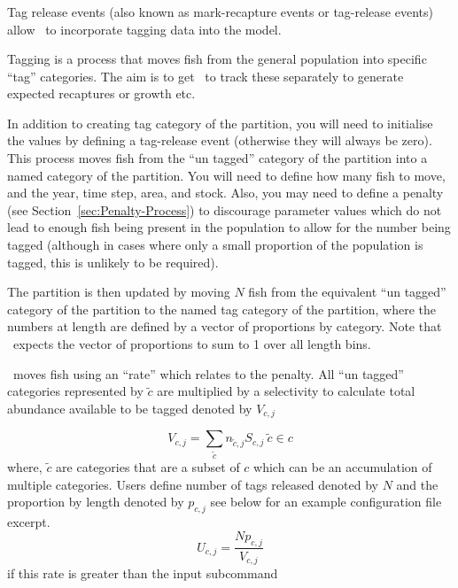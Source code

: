 \subsubsection{}\label{sec:Process-Tagging} 
Tag release events (also known as mark-recapture events or tag-release events) allow \CNAME\ to incorporate tagging data into the model.

Tagging is a process that moves fish from the general population into specific \enquote{tag} categories. The aim is to get \CNAME\ to track these separately to generate expected recaptures or growth etc.

In addition to creating tag category of the partition, you will need to initialise the values by defining a tag-release event (otherwise they will always be zero). This process moves fish from the \enquote{un tagged} category of the partition into a named category of the partition. You will need to define how many fish to move, and the year, time step, area, and stock. Also, you may
need to define a penalty (see Section~\ref{sec:Penalty-Process}) to discourage parameter values which do not lead to enough fish being present in the population to allow for the number being tagged (although in cases where only a small proportion of the population is tagged, this is unlikely to be required).

The partition is then updated by moving \(N\) fish from the equivalent \enquote{un tagged} category of the partition to the named tag category of the partition, where the numbers at length are defined by a vector of proportions by category. Note that \CNAME\ expects the vector of proportions to sum to 1 over all length bins.

\CNAME\ moves fish using an \enquote{rate} which relates to the penalty. All \enquote{un tagged} categories represented by \(\tilde{c}\) are multiplied by a selectivity to calculate total abundance available to be tagged denoted by \(V_{c,j}\)

\begin{equation*}
	V_{c,j} = \sum\limits_{\tilde{c}} n_{\tilde{c}, j} S_{c,j} \ \tilde{c} \in c
\end{equation*}
%
where, \(\tilde{c}\) are categories that are a subset of \(c\) which can be an accumulation of multiple categories. Users define number of tags released denoted by \(N\) and the proportion by length denoted by \(p_{c,j}\) see below for an example configuration file excerpt.
\begin{equation*}
U_{c,j} = \frac{Np_{c,j}}{V_{c,j}}
\end{equation*}
%
if this rate is greater than the input subcommand 

